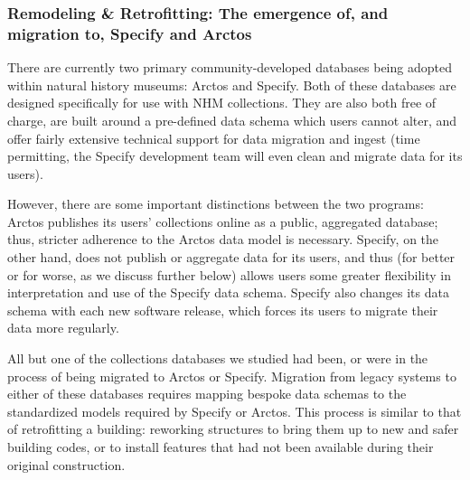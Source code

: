 \subsubsection{Remodeling \& Retrofitting: The emergence of, and migration to, Specify and Arctos}
There are currently two primary community-developed databases being adopted within natural history museums: Arctos and Specify. Both of these databases are designed specifically for use with NHM collections. They are also both free of charge, are built around a pre-defined data schema which users cannot alter, and offer fairly extensive technical support for data migration and ingest (time permitting, the Specify development team will even clean and migrate data for its users). 

However, there are some important distinctions between the two programs: Arctos publishes its users’ collections online as a public, aggregated database; thus, stricter adherence to the Arctos data model is necessary. Specify, on the other hand, does not publish or aggregate data for its users, and thus (for better or for worse, as we discuss further below) allows users some greater flexibility in interpretation and use of the Specify data schema. Specify also changes its data schema with each new software release, which forces its users to migrate their data more regularly.

All but one of the collections databases we studied had been, or were in the process of being migrated to Arctos or Specify. Migration from legacy systems to either of these databases requires mapping bespoke data schemas to the standardized models required by Specify or Arctos. This process is similar to that of retrofitting a building: reworking structures to bring them up to new and safer building codes, or to install features that had not been available during their original construction. 

